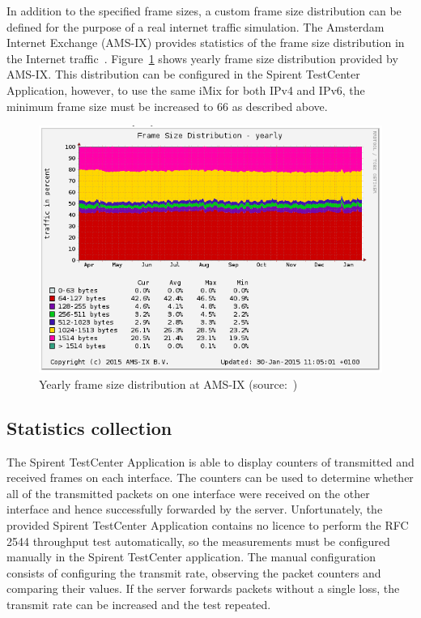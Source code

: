 In addition to the specified frame sizes, a custom frame size distribution can be defined for the purpose of
a real internet traffic simulation.
The Amsterdam Internet Exchange (AMS-IX) provides
statistics of the frame size distribution in the Internet traffic~\cite{amsix-frame-size}.
Figure~\ref{fig:analysis-amsix-frame-size} shows yearly frame size distribution provided by AMS-IX.
This distribution can be configured in the Spirent TestCenter Application, however,
to use the same iMix for both IPv4 and IPv6, the minimum frame size must be increased to 66 as described above.
\begin{figure}
	\centering
	\includegraphics[width=14.5cm,keepaspectratio]{fig/amsix.png}
	\caption{Yearly frame size distribution at AMS-IX (source:~\cite{amsix-frame-size})}
	\label{fig:analysis-amsix-frame-size}
\end{figure}

\subsection{Statistics collection}
The Spirent TestCenter Application is able to display counters of transmitted and received frames on each interface.
The counters can be used to determine whether all of the transmitted packets on one interface were received
on the other interface and hence successfully forwarded by the server.
Unfortunately, the provided Spirent TestCenter Application contains no licence to perform the RFC 2544 throughput test
automatically, so the measurements must be configured manually in the Spirent TestCenter application.
The manual configuration consists of configuring the transmit rate, observing the packet counters and comparing their values.
If the server forwards packets without a single loss, the transmit rate can be increased and the test repeated.

